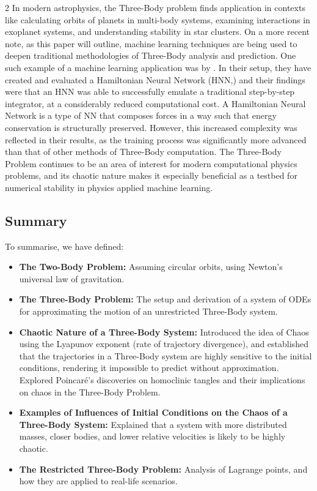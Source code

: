 \documentclass{article}
\begin{document}
\begin{multicols}{2}
In modern astrophysics, the Three-Body problem finds application in contexts like calculating orbits of planets in multi-body systems, examining interactions in exoplanet systems, and understanding stability in star clusters. On a more recent note, as this paper will outline, machine learning techniques are being used to deepen traditional methodologies of Three-Body analysis and prediction. One such example of a machine learning application was by \cite{ulibarrena2024hybrid}. In their setup, they have created and evaluated a Hamiltonian Neural Network (HNN,) and their findings were that an HNN was able to successfully emulate a traditional step-by-step integrator, at a considerably reduced computational cost. A Hamiltonian Neural Network is a type of NN that composes forces in a way such that energy conservation is structurally preserved. However, this increased complexity was reflected in their results, as the training process was significantly more advanced than that of other methods of Three-Body computation. The Three-Body Problem continues to be an area of interest for modern computational physics problems, and its chaotic nature makes it especially beneficial as a testbed for numerical stability in physics applied machine learning.

\subsection{Summary}

To summarise, we have defined:

\begin{itemize}
    \item \textbf{The Two-Body Problem:} Assuming circular orbits, using Newton's universal law of gravitation.
    \item \textbf{The Three-Body Problem:} The setup and derivation of a system of ODEs for approximating the motion of an unrestricted Three-Body system.
    \item \textbf{Chaotic Nature of a Three-Body System:} Introduced the idea of Chaos using the Lyapunov exponent (rate of trajectory divergence), and established that the trajectories in a Three-Body system are highly sensitive to the initial conditions, rendering it impossible to predict without approximation. Explored Poincaré's discoveries on homoclinic tangles and their implications on chaos in the Three-Body Problem.
    \item \textbf{Examples of Influences of Initial Conditions on the Chaos of a Three-Body System:} Explained that a system with more distributed masses, closer bodies, and lower relative velocities is likely to be highly chaotic.
    \item \textbf{The Restricted Three-Body Problem:} Analysis of Lagrange points, and how they are applied to real-life scenarios.
\end{itemize}


\end{multicols}
\end{document}
